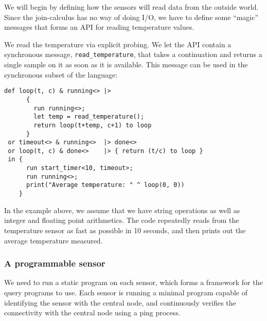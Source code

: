 We will begin by defining how the sensors will read data from the
outside world. Since the join-calculus has no way of doing I/O, we
have to define some ``magic'' messages that forms an API for reading
temperature values.

We read the temperature via explicit probing. We let the API
contain a synchronous message, \verb!read_temperature!, that takes
a continuation and returns a single sample on it as soon as it is
available. This message can be used in the synchronous subset of
the language:

\begin{verbatim}
def loop(t, c) & running<> |>
      {
        run running<>;
        let temp = read_temperature();
        return loop(t+temp, c+1) to loop
      }
 or timeout<> & running<>  |> done<>
 or loop(t, c) & done<>    |> { return (t/c) to loop }
 in {
      run start_timer<10, timeout>;
      run running<>;
      print("Average temperature: " ^ loop(0, 0))
    }
\end{verbatim}

In the example above, we assume that we have string operations as
well as integer and floating point arithmetics. The code repeatedly
reads from the temperature sensor as fast as possible in 10
seconds, and then prints out the average temperature measured.

\subsubsection{A programmable sensor}

We need to run a static program on each sensor, which forms a framework
for the query programs to use.
Each sensor is running a minimal program capable of identifying the
sensor with the central node, and continuously verifies the
connectivity with the central node using a ping process.

